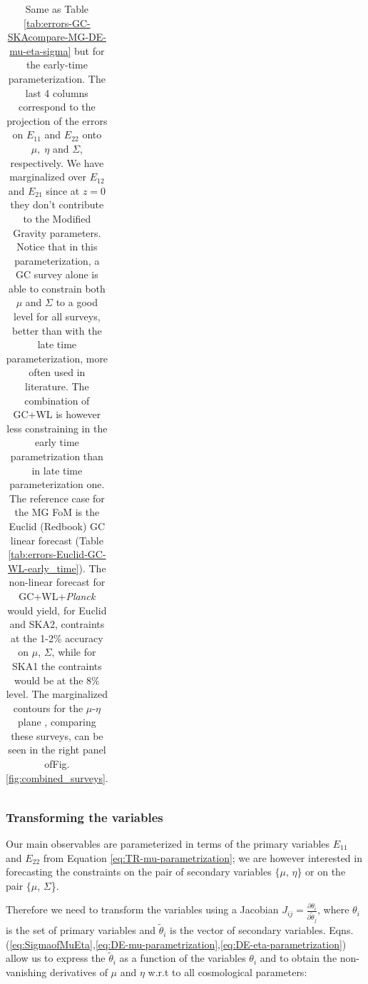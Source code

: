 \begin{table}[htbp]
\begin{tabular}{|l|c|c|c|c|c||c|c|c|c|}
\hline
\end{tabular}
\small
\caption[1$\sigma$ marginalized errors for Euclid, DESI-ELG, SKA1 and SKA2 forecasts in the early-time parameterization.]{\label{tab:errors-GC-SKAcompare-MG-TR-mu-eta-sigma-Zhao-1}
Same as Table \ref{tab:errors-GC-SKAcompare-MG-DE-mu-eta-sigma} but for the early-time parameterization.
The last 4 columns correspond to the
projection of the errors on $E_{11}$ and $E_{22}$ onto $\mu,\;\eta$ and $\Sigma$, respectively. 
We have marginalized over $E_{12}$
and $E_{21}$ since at $z=0$ they don't contribute to the Modified
Gravity parameters. Notice that in this
parameterization, a GC survey alone is able to constrain both $\mu$ and $\Sigma$ to a good level for all surveys, better than with the late time parameterization, more often used in literature. The combination of GC+WL is however less constraining in the early time parametrization than in late time parameterization one. The reference case for the MG FoM is the Euclid (Redbook) GC linear forecast (Table \ref{tab:errors-Euclid-GC-WL-early_time}).
The non-linear forecast for GC+WL+{\it Planck} would yield, for Euclid and SKA2, contraints at the 1-2\% accuracy on $\mu$, $\Sigma$, while
for SKA1 the contraints would be at the 8\% level. The marginalized contours for the $\mu$-$\eta$ plane , comparing these surveys, can be seen in the right panel ofFig.\ref{fig:combined_surveys}.
}
\end{table}
\normalsize


\subsubsection{Transforming the variables \label{subsub:Jacobian}}
Our main observables are parameterized
in terms of the primary variables $E_{11}$ and $E_{22}$ from Equation
\ref{eq:TR-mu-parametrization}; we are however interested in forecasting
the constraints on the pair of secondary variables $\{\mu$, $\eta\}$
or on the pair $\{\mu$, $\Sigma$\}.

Therefore we need to transform the variables using a Jacobian
$J_{ij}=\frac{\partial\theta_{i}}{\partial\tilde{\theta}_{j}}$,
where $\theta_{i}$ is the set of primary variables and $\tilde{\theta}_{i}$
is the vector of secondary variables. 
Eqns. (\ref{eq:SigmaofMuEta},\ref{eq:DE-mu-parametrization},\ref{eq:DE-eta-parametrization})
allow us to express the $\tilde{\theta}_{i}$ as a function of the variables $\theta_{i}$ and 
to obtain the non-vanishing derivatives
of $\mu$ and $\eta$ w.r.t to all cosmological parameters:

